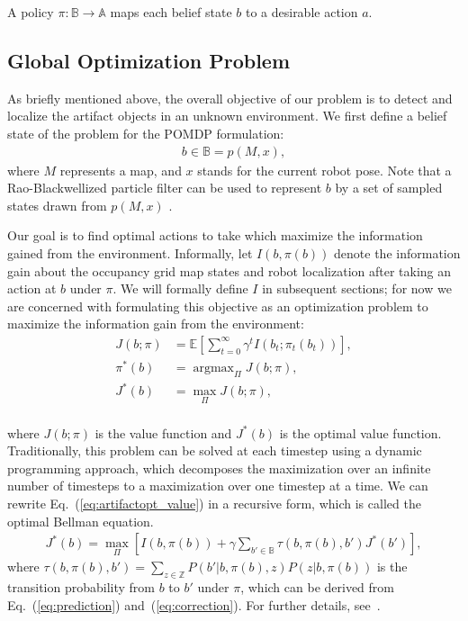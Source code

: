 \documentclass[letterpaper, 10 pt, conference]{ieeeconf}  %
\newcommand{\note}[1]{{\color{cyan} NOTE: #1 }}
\newcommand{\argmax}{\mathop{\mathrm{argmax}}}
\begin{document}
A policy $\pi : \mathbb{B} \rightarrow \mathbb{A}$ maps each belief state $b$ to a desirable action $a$.

\subsection{Global Optimization Problem}

As briefly mentioned above, the overall objective of our problem is to detect and localize the artifact objects in an unknown environment.  We first define a belief state of the problem for the POMDP formulation:
\begin{align}
  b \in \mathbb{B} = p(M, x),
\end{align}
where $M$ represents a map, and $x$ stands for the current robot pose.
Note that a Rao-Blackwellized particle filter can be used to represent $b$ by a set of sampled states drawn from $p(M, x)$ \cite{stachniss2005information}.

Our goal is to find optimal actions to take which maximize the information gained from the environment.  Informally, let $I(b, \pi(b))$ denote the information gain about the occupancy grid map states and robot localization after taking an action at $b$ under $\pi$.  We will formally define $I$ in subsequent sections; for now we are concerned with formulating this objective as an optimization problem to maximize the information gain from the environment:
\begin{align}
  J(b;\pi) &= \mathbb{E} \left[ \sum_{t=0}^\infty \gamma^t I(b_t; \pi_t(b_t)) \right], \label{eq:artifactopt_cost}\\
  \pi^*(b) & = \argmax_{\Pi} J(b;\pi), \label{eq:artifactopt}\\
  J^*(b) &= \max_{\Pi} J(b;\pi) , \label{eq:artifactopt_value}\\
\end{align}


where $J(b;\pi)$ is the value function and $J^*(b)$ is the optimal value function.  Traditionally, this problem can be solved at each timestep using a dynamic programming approach, which decomposes the maximization over an infinite number of timesteps to a maximization over one timestep at a time.  We can rewrite Eq.~(\ref{eq:artifactopt_value}) in a recursive form, which is called the optimal Bellman equation.
\begin{align}
J^*(b) = \max_{\Pi} \left[I(b, \pi(b)) %
   + \gamma \sum_{b' \in \mathbb{B}} \tau(b, \pi(b), b') J^*(b')\right],
  \label{eq:bellman}
\end{align}
where $\tau(b, \pi(b), b') = \sum_{z \in \mathbb{Z}} P(b'|b,\pi(b),z) P(z|b,\pi(b))$ is the transition probability from $b$ to $b'$ under $\pi$,
which can be derived from Eq.~(\ref{eq:prediction}) and~(\ref{eq:correction}).
For further details, see~\cite{Ross08}.
\end{document}
